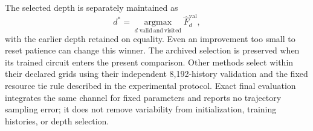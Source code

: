 The selected depth is separately maintained as
\begin{equation}
    d^*=\underset{d\;\mathrm{valid\ and\ visited}}{\operatorname{argmax}}
    \widehat F_d^{\mathrm{val}},
    \label{eq:depth_winner}
\end{equation}
with the earlier depth retained on equality. Even an improvement too small to reset patience can change this winner. The archived selection is preserved when its trained circuit enters the present comparison. Other methods select within their declared grids using their independent 8,192-history validation and the fixed resource tie rule described in the experimental protocol. Exact final evaluation integrates the same channel for fixed parameters and reports no trajectory sampling error; it does not remove variability from initialization, training histories, or depth selection.

